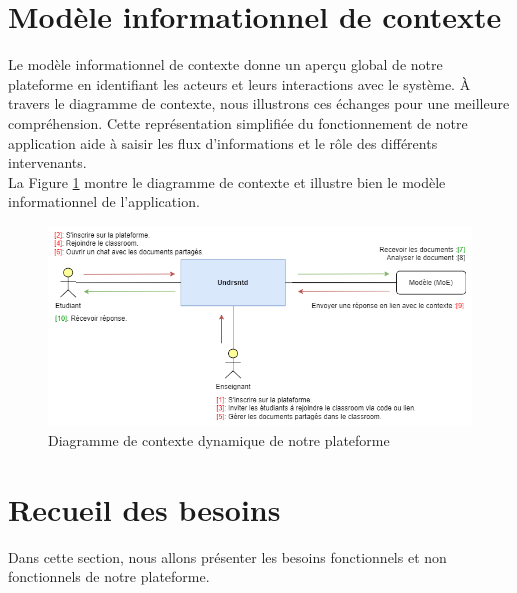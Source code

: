 \section{Modèle informationnel de contexte}
\justifying
Le modèle informationnel de contexte donne un aperçu global de notre plateforme en identifiant les acteurs et leurs interactions avec le système. À travers le diagramme de contexte, nous illustrons ces échanges pour une meilleure compréhension. Cette représentation simplifiée du fonctionnement de notre application aide à saisir les flux d'informations et le rôle des différents intervenants.\\
La Figure \ref{fig:diagramme de context} montre le diagramme de contexte et illustre bien le modèle informationnel de l'application.

\begin{figure}[H]
    \centering
    \includegraphics[width=1\textwidth,height=0.35\textheight]{images/chp3/fig1.png}
    \caption{Diagramme de contexte dynamique de notre plateforme}
    \label{fig:diagramme de context}    
\end{figure}
\section{Recueil des besoins}
\justifying
Dans cette section, nous allons présenter les besoins fonctionnels et non fonctionnels de notre plateforme.

